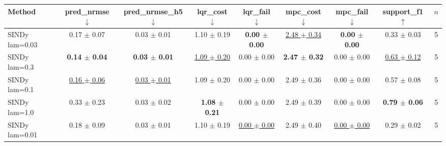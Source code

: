 \begin{tabular}{lcccccccc}
\toprule
Method & pred\_nrmse $\downarrow$ & pred\_nrmse\_h5 $\downarrow$ & lqr\_cost $\downarrow$ & lqr\_fail $\downarrow$ & mpc\_cost $\downarrow$ & mpc\_fail $\downarrow$ & support\_f1 $\uparrow$ & $n$ \\
\midrule
SINDy lam=0.03 & 0.17 $\pm$ 0.07 & 0.03 $\pm$ 0.01 & 1.10 $\pm$ 0.19 & \textbf{0.00 $\pm$ 0.00} & \underline{2.48 $\pm$ 0.34} & \textbf{0.00 $\pm$ 0.00} & 0.33 $\pm$ 0.03 & 5 \\
SINDy lam=0.3 & \textbf{0.14 $\pm$ 0.04} & \textbf{0.03 $\pm$ 0.01} & \underline{1.09 $\pm$ 0.20} & 0.00 $\pm$ 0.00 & \textbf{2.47 $\pm$ 0.32} & 0.00 $\pm$ 0.00 & \underline{0.63 $\pm$ 0.12} & 5 \\
SINDy lam=0.1 & \underline{0.16 $\pm$ 0.06} & \underline{0.03 $\pm$ 0.01} & 1.09 $\pm$ 0.20 & 0.00 $\pm$ 0.00 & 2.49 $\pm$ 0.36 & 0.00 $\pm$ 0.00 & 0.57 $\pm$ 0.08 & 5 \\
SINDy lam=1.0 & 0.33 $\pm$ 0.23 & 0.03 $\pm$ 0.02 & \textbf{1.08 $\pm$ 0.21} & 0.00 $\pm$ 0.00 & 2.49 $\pm$ 0.39 & 0.00 $\pm$ 0.00 & \textbf{0.79 $\pm$ 0.06} & 5 \\
SINDy lam=0.01 & 0.18 $\pm$ 0.09 & 0.03 $\pm$ 0.01 & 1.10 $\pm$ 0.19 & \underline{0.00 $\pm$ 0.00} & 2.49 $\pm$ 0.40 & \underline{0.00 $\pm$ 0.00} & 0.29 $\pm$ 0.02 & 5 \\
\bottomrule
\end{tabular}
